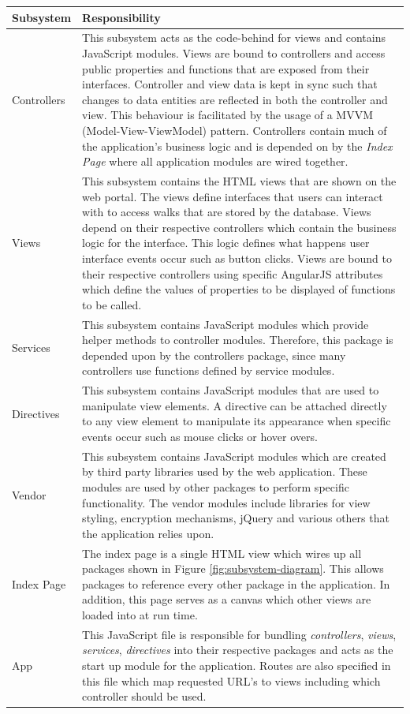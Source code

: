 \documentclass[11pt,a4paper]{report}
\begin{document}
\begin{center}
\begin{tabularx}{\textwidth}{|l|X|}
\hline \textbf{Subsystem} & \textbf{Responsibility} \\ 
\hline Controllers & This subsystem acts as the code-behind for views and contains JavaScript modules. Views are bound to controllers and access public properties and functions that are exposed from their interfaces. Controller and view data is kept in sync such that changes to data entities are reflected in both the controller and view. This behaviour is facilitated by the usage of a MVVM (Model-View-ViewModel) pattern. Controllers contain much of the application's business logic and is depended on by the \emph{Index Page} where all application modules are wired together. \\ 
\hline Views & This subsystem contains the HTML views that are shown on the web portal. The views define interfaces that users can interact with to access walks that are stored by the database. Views depend on their respective controllers which contain the business logic for the interface. This logic defines what happens user interface events occur such as button clicks. Views are bound to their respective controllers using specific AngularJS attributes which define the values of properties to be displayed of functions to be called. \\ 
\hline Services & This subsystem contains JavaScript modules which provide helper methods to controller modules. Therefore, this package is depended upon by the controllers package, since many controllers use functions defined by service modules. \\ 
\hline Directives & This subsystem contains JavaScript modules that are used to manipulate view elements. A directive can be attached directly to any view element to manipulate its appearance when specific events occur such as mouse clicks or hover overs. \\ 
\hline Vendor & This subsystem contains JavaScript modules which are created by third party libraries used by the web application. These modules are used by other packages to perform specific functionality. The vendor modules include libraries for view styling, encryption mechanisms, jQuery and various others that the application relies upon.  \\ 
\hline Index Page & The index page is a single HTML view which wires up all packages shown in Figure \ref{fig:subsystem-diagram}. This allows packages to reference every other package in the application. In addition, this page serves as a canvas which other views are loaded into at run time. \\ 
\hline App & This JavaScript file is responsible for bundling \emph{controllers}, \emph{views}, \emph{services}, \emph{directives} into their respective packages and acts as the start up module for the application. Routes are also specified in this file which map requested URL's to views including which controller should be used. \\ 
\hline 
\end{tabularx} 
\end{center}
\end{document}
